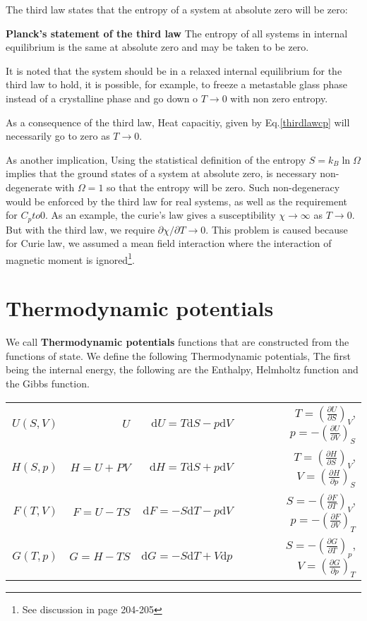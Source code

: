 \documentclass{article}
\newcommand{\pfrac}[2]{\frac{\partial #1}{\partial #2}}
\newcommand{\dnor}{\text{d}}
\begin{document}
The third law states that the entropy of a system at absolute zero will be zero:

\textbf{Planck's statement of the third law} The entropy of all systems in internal
equilibrium is the same at absolute zero and may be taken to be zero.

It is noted that the system should be in a relaxed internal equilibrium for the third law
to hold, it is possible,
for example, to freeze a metastable glass phase instead of a crystalline phase and go down
o $T \to 0$ with non zero entropy.

As a consequence of the third law, Heat capacitiy, given by Eq.\ref{thirdlawcp} will
necessarily go to zero as $T\to0$.

As another implication, Using the statistical definition of the entropy $S = k_B \ln \Omega$
implies that the ground states of a system at absolute zero, is necessary non-degenerate with
$\Omega = 1$ so that the entropy will be zero. Such non-degeneracy would be enforced by the 
third law for real systems, as well as the requirement for $C_pto 0$. 
As an example, the curie's law gives a susceptibility $\chi \to \infty$ as $T \to 0$. But with
the third law, we require $\partial \chi / \partial T \to 0$. This problem is caused because
for Curie law, we assumed a mean field interaction where the interaction of magnetic
moment is ignored\footnote{See discussion in page 204-205}. 

\section{Thermodynamic potentials}
We call \textbf{Thermodynamic potentials} functions that are constructed from 
the functions of state. 
We define the following Thermodynamic potentials, The first being the internal 
energy, the following are the Enthalpy, Helmholtz function and the Gibbs 
function.

\begin{table*}[h]
    \centering
    \begin{tabular}{rrrr}
     $U(S,V)$ &   $U$          & $\dnor U =   T \dnor S - p \dnor V$ & $T = \left(\pfrac{U}{S}\right)_V$, $p = -\left(\pfrac{U}{V}\right)_S$ \\
     $H(S,p)$ &   $H = U + PV$ & $\dnor H =   T \dnor S + p \dnor V$ & $T = \left(\pfrac{H}{S}\right)_V$, $V = \left(\pfrac{H}{p}\right)_S$ \\
     $F(T,V)$ &   $F = U - TS$ & $\dnor F = - S \dnor T - p \dnor V$ & $S = -\left(\pfrac{F}{T}\right)_V$, $p = -\left(\pfrac{F}{V}\right)_T$ \\
     $G(T,p)$ &   $G = H - TS$ & $\dnor G = - S \dnor T + V \dnor p$ & $S = -\left(\pfrac{G}{T}\right)_p$, $V = \left(\pfrac{G}{p}\right)_T$ \\
     \end{tabular}
\end{table*}
\end{document}
